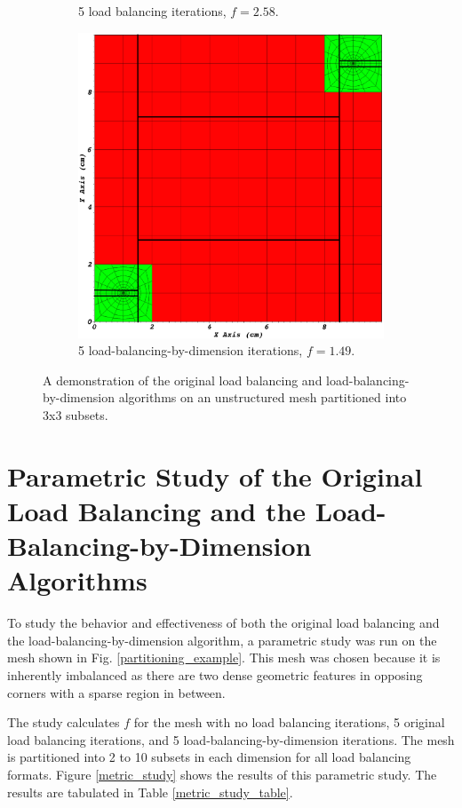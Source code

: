 \begin{figure}[H]
\begin{subfigure}[b]{0.49\textwidth}
\caption{5 load balancing iterations, $f = 2.58$.}
\label{3x3_lb}
\end{subfigure}
\begin{subfigure}[b]{0.49\textwidth}
\centering
\includegraphics[scale=0.13]{../figures/ubp_3x3_lbd.png}
\caption{5 load-balancing-by-dimension iterations, $f = 1.49$.}
\label{3x3_lbd}
\end{subfigure}
\caption{A demonstration of the original load balancing and load-balancing-by-dimension algorithms on an unstructured mesh partitioned into 3x3 subsets.}
\label{alg_illustration}
\end{figure}

\section{Parametric Study of the Original Load Balancing and the Load-Balancing-by-Dimension Algorithms}
To study the behavior and effectiveness of both the original load balancing and the load-balancing-by-dimension algorithm, a parametric study was run on the mesh shown in Fig. \ref{partitioning_example}.
This mesh was chosen because it is inherently imbalanced as there are two dense geometric features in opposing corners with a sparse region in between.

The study calculates $f$ for the mesh with no load balancing iterations, 5 original load balancing iterations, and 5 load-balancing-by-dimension iterations.
The mesh is partitioned into 2 to 10 subsets in each dimension for all load balancing formats.
Figure \ref{metric_study} shows the results of this parametric study.
The results are tabulated in Table \ref{metric_study_table}.

